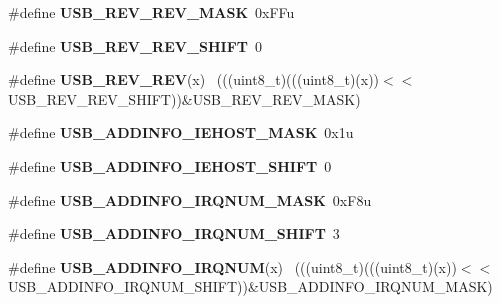 \begin{DoxyCompactItemize}
\item 
\hypertarget{group___u_s_b___register___masks_ga72a356a066674e41e3827b0ccb931e71}{}\#define {\bfseries U\+S\+B\+\_\+\+R\+E\+V\+\_\+\+R\+E\+V\+\_\+\+M\+A\+S\+K}~0x\+F\+Fu\label{group___u_s_b___register___masks_ga72a356a066674e41e3827b0ccb931e71}

\item 
\hypertarget{group___u_s_b___register___masks_gab058ebe4be52454e46ef15ce015ac5fd}{}\#define {\bfseries U\+S\+B\+\_\+\+R\+E\+V\+\_\+\+R\+E\+V\+\_\+\+S\+H\+I\+F\+T}~0\label{group___u_s_b___register___masks_gab058ebe4be52454e46ef15ce015ac5fd}

\item 
\hypertarget{group___u_s_b___register___masks_ga07d0c26b6db6e64d946e60bbd8879db0}{}\#define {\bfseries U\+S\+B\+\_\+\+R\+E\+V\+\_\+\+R\+E\+V}(x)                                                  ~(((uint8\+\_\+t)(((uint8\+\_\+t)(x))$<$$<$U\+S\+B\+\_\+\+R\+E\+V\+\_\+\+R\+E\+V\+\_\+\+S\+H\+I\+F\+T))\&U\+S\+B\+\_\+\+R\+E\+V\+\_\+\+R\+E\+V\+\_\+\+M\+A\+S\+K)\label{group___u_s_b___register___masks_ga07d0c26b6db6e64d946e60bbd8879db0}

\item 
\hypertarget{group___u_s_b___register___masks_gacb7c792034c73c4861bc8fba6ff4314f}{}\#define {\bfseries U\+S\+B\+\_\+\+A\+D\+D\+I\+N\+F\+O\+\_\+\+I\+E\+H\+O\+S\+T\+\_\+\+M\+A\+S\+K}~0x1u\label{group___u_s_b___register___masks_gacb7c792034c73c4861bc8fba6ff4314f}

\item 
\hypertarget{group___u_s_b___register___masks_gad256dcdfe8443877169b69dbcc8a041e}{}\#define {\bfseries U\+S\+B\+\_\+\+A\+D\+D\+I\+N\+F\+O\+\_\+\+I\+E\+H\+O\+S\+T\+\_\+\+S\+H\+I\+F\+T}~0\label{group___u_s_b___register___masks_gad256dcdfe8443877169b69dbcc8a041e}

\item 
\hypertarget{group___u_s_b___register___masks_gaa578584bfaf89e26213e6ba12e5f4b0e}{}\#define {\bfseries U\+S\+B\+\_\+\+A\+D\+D\+I\+N\+F\+O\+\_\+\+I\+R\+Q\+N\+U\+M\+\_\+\+M\+A\+S\+K}~0x\+F8u\label{group___u_s_b___register___masks_gaa578584bfaf89e26213e6ba12e5f4b0e}

\item 
\hypertarget{group___u_s_b___register___masks_ga3332243caa9e2f9cfc49b031ac54cbda}{}\#define {\bfseries U\+S\+B\+\_\+\+A\+D\+D\+I\+N\+F\+O\+\_\+\+I\+R\+Q\+N\+U\+M\+\_\+\+S\+H\+I\+F\+T}~3\label{group___u_s_b___register___masks_ga3332243caa9e2f9cfc49b031ac54cbda}

\item 
\hypertarget{group___u_s_b___register___masks_ga1af2106db3477ecccb2d3b1c627c6da1}{}\#define {\bfseries U\+S\+B\+\_\+\+A\+D\+D\+I\+N\+F\+O\+\_\+\+I\+R\+Q\+N\+U\+M}(x)                                    ~(((uint8\+\_\+t)(((uint8\+\_\+t)(x))$<$$<$U\+S\+B\+\_\+\+A\+D\+D\+I\+N\+F\+O\+\_\+\+I\+R\+Q\+N\+U\+M\+\_\+\+S\+H\+I\+F\+T))\&U\+S\+B\+\_\+\+A\+D\+D\+I\+N\+F\+O\+\_\+\+I\+R\+Q\+N\+U\+M\+\_\+\+M\+A\+S\+K)\label{group___u_s_b___register___masks_ga1af2106db3477ecccb2d3b1c627c6da1}


\end{DoxyCompactItemize}
